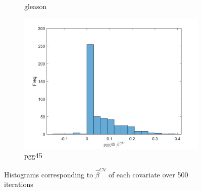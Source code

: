 \documentclass{article}
\begin{document}
\begin{figure}[ht]
\begin{subfigure}[b]{0.5\linewidth}
			\caption{gleason} 
			\label{gleason} 
		\end{subfigure}%
		\begin{subfigure}[b]{0.5\linewidth}
			\centering
			\includegraphics[width=0.75\linewidth]{figures/q8_9.jpg} 
			\caption{pgg45} 
			\label{pgg45} 
		\end{subfigure} 
		\caption{Histograms corresponding to $ \hat{\beta}^{CV} $ of each covariate over 500 iterations}
		\label{q8_3} 
	\end{figure}
\end{document}
